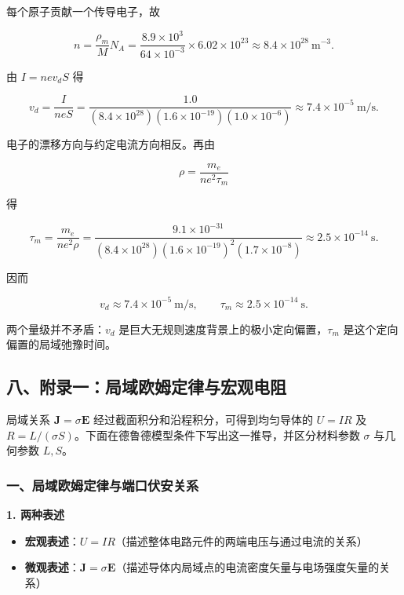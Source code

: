 每个原子贡献一个传导电子，故

\[
n=\frac{\rho_m}{M}N_A
=\frac{8.9\times10^3}{64\times10^{-3}}
\times6.02\times10^{23}
\approx8.4\times10^{28}\ \mathrm{m^{-3}}.
\]

由 \(I=ne v_dS\) 得

\[
v_d=\frac{I}{neS}
=\frac{1.0}{
(8.4\times10^{28})(1.6\times10^{-19})(1.0\times10^{-6})}
\approx7.4\times10^{-5}\ \mathrm{m/s}.
\]

电子的漂移方向与约定电流方向相反。再由

\[
\rho=\frac{m_e}{ne^2\tau_m}
\]

得

\[
\tau_m
=\frac{m_e}{ne^2\rho}
=\frac{9.1\times10^{-31}}
{(8.4\times10^{28})(1.6\times10^{-19})^2
(1.7\times10^{-8})}
\approx2.5\times10^{-14}\ \mathrm s.
\]

因而

\[
\boxed{v_d\approx7.4\times10^{-5}\ \mathrm{m/s}},
\qquad
\boxed{\tau_m\approx2.5\times10^{-14}\ \mathrm s}.
\]

两个量级并不矛盾：\(v_d\)
是巨大无规则速度背景上的极小定向偏置，\(\tau_m\)
是这个定向偏置的局域弛豫时间。

\subsection{八、附录一：局域欧姆定律与宏观电阻}\label{m4:ux516bux9644ux5f55ux4e00ux5c40ux57dfux6b27ux59c6ux5b9aux5f8bux4e0eux5b8fux89c2ux7535ux963b}

局域关系 \(\mathbf J=\sigma\mathbf E\)
经过截面积分和沿程积分，可得到均匀导体的 \(U=IR\) 及
\(R=L/(\sigma S)\)。下面在德鲁德模型条件下写出这一推导，并区分材料参数
\(\sigma\) 与几何参数 \(L,S\)。

\subsubsection{一、局域欧姆定律与端口伏安关系}\label{m4:ux4e00ux5c40ux57dfux6b27ux59c6ux5b9aux5f8bux4e0eux7aefux53e3ux4f0fux5b89ux5173ux7cfb}

\textbf{1. 两种表述}

\begin{itemize}
\tightlist
\item
  \textbf{宏观表述}：\(U = I R\)（描述整体电路元件的两端电压与通过电流的关系）
\item
  \textbf{微观表述}：\(\mathbf{J} = \sigma \mathbf{E}\)（描述导体内局域点的电流密度矢量与电场强度矢量的关系）
\end{itemize}

